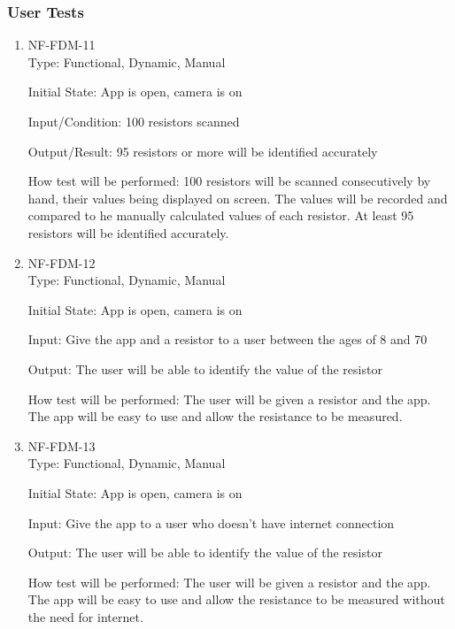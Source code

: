 \documentclass[12pt, titlepage]{article}
\begin{document}
\subsubsection{User Tests}
\begin{enumerate}
\item{NF-FDM-11\\}
Type: Functional, Dynamic, Manual
					
Initial State: 
App is open, camera is on
					
Input/Condition: 
100 resistors scanned
					
Output/Result: 
95 resistors or more will be identified accurately
					
How test will be performed: 
100 resistors will be scanned consecutively by hand, their values being displayed on screen. The values will be recorded and compared to he manually calculated values of each resistor. At least 95 resistors will be identified accurately.
					
\item{NF-FDM-12\\}
Type: Functional, Dynamic, Manual
					
Initial State: 
App is open, camera is on
					
Input: 
Give the app and a resistor to a user between the ages of 8 and 70
					
Output: 
The user will be able to identify the value of the resistor
					
How test will be performed: 
The user will be given a resistor and the app. The app will be easy to use and allow the resistance to be measured.

\item{NF-FDM-13\\}
Type: Functional, Dynamic, Manual
					
Initial State: 
App is open, camera is on
					
Input: 
Give the app to a user who doesn't have internet connection
					
Output: 
The user will be able to identify the value of the resistor
					
How test will be performed: 
The user will be given a resistor and the app. The app will be easy to use and allow the resistance to be measured without the need for internet.

\end{enumerate}
\end{document}
